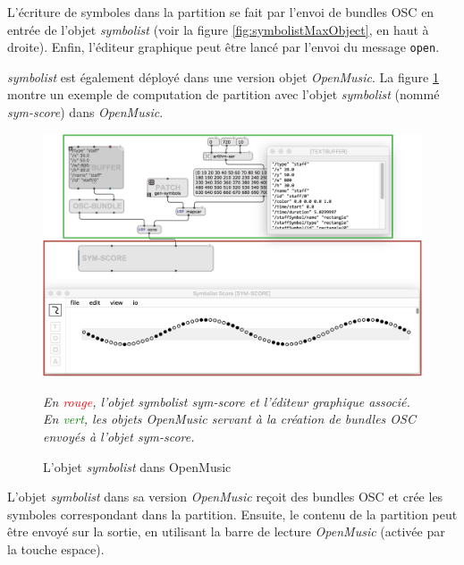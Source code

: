 L'écriture de symboles dans la partition se fait par l'envoi de bundles OSC en entrée de l'objet \textit{symbolist} (voir la figure \ref{fig:symbolistMaxObject}, en haut à droite). 
Enfin, l'éditeur graphique peut être lancé par l'envoi du message \lstinline|open|.

\textit{symbolist} est également déployé dans une version objet \textit{OpenMusic}. La figure \ref{fig:symbolistOMObject} montre un exemple de computation de partition avec l'objet \textit{symbolist} (nommé \textit{sym-score}) dans \textit{OpenMusic}.

\begin{figure}[H]
	\centering
	\includegraphics[keepaspectratio=true, width=\textwidth]{LeProjetSymbolist/i/symbolistOMObject.png}
	\caption{L'objet \textit{symbolist} dans OpenMusic}
	\label{fig:symbolistOMObject}
	\small
	\it
	En \textcolor{red}{rouge}, l'objet \emph{symbolist} \og sym-score \fg et l'éditeur graphique associé.
	En \textcolor{green}{vert}, les objets \emph{OpenMusic} servant à la création de bundles OSC envoyés à l'objet \emph{sym-score}.
\end{figure}

L'objet \textit{symbolist} dans sa version \textit{OpenMusic} reçoit des bundles OSC et crée les symboles correspondant dans la partition. Ensuite, le contenu de la partition peut être envoyé sur la sortie, en utilisant la barre de lecture \textit{OpenMusic} (activée par la touche espace).    

